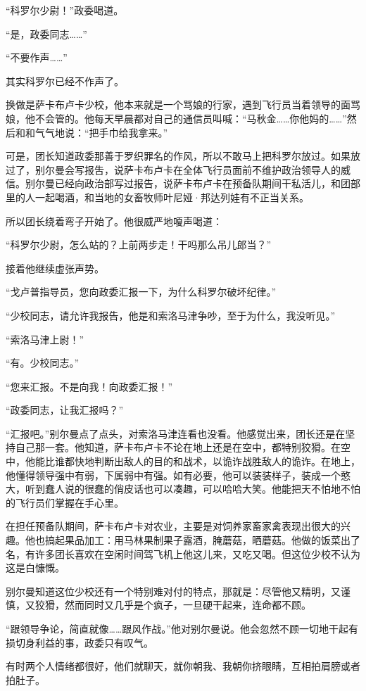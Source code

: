 “科罗尔少尉！”政委喝道。

“是，政委同志……”

“不要作声……”

其实科罗尔已经不作声了。

换做是萨卡布卢卡少校，他本来就是一个骂娘的行家，遇到飞行员当着领导的面骂娘，他不会管的。他每天早晨都对自己的通信员叫喊：“马秋金……你他妈的……”然后和和气气地说：“把手巾给我拿来。”

可是，团长知道政委那善于罗织罪名的作风，所以不敢马上把科罗尔放过。如果放过了，别尔曼会写报吿，说萨卡布卢卡在全体飞行员面前不维护政治领导人的威信。别尔曼已经向政治部写过报告，说萨卡布卢卡在预备队期间干私活儿，和团部里的人一起喝酒，和当地的女畜牧师叶尼娅·邦达列娃有不正当关系。

所以团长绕着弯子开始了。他很威严地嗄声喝道：

“科罗尔少尉，怎么站的？上前两步走！干吗那么吊儿郎当？”

接着他继续虚张声势。

“戈卢普指导员，您向政委汇报一下，为什么科罗尔破坏纪律。”

“少校同志，请允许我报告，他是和索洛马津争吵，至于为什么，我没听见。”

“索洛马津上尉！”

“有。少校同志。”

“您来汇报。不是向我！向政委汇报！”

“政委同志，让我汇报吗？”

“汇报吧。”别尔曼点了点头，对索洛马津连看也没看。他感觉出来，团长还是在坚持自己那一套。他知道，萨卡布卢卡不论在地上还是在空中，都特别狡猾。在空中，他能比谁都快地判断出敌人的目的和战术，以诡诈战胜敌人的诡诈。在地上，他懂得领导强中有弱，下属弱中有强。如有必要，他可以装装样子，装成一个憨大，听到蠢人说的很蠢的俏皮话也可以凑趣，可以哈哈大笑。他能把天不怕地不怕的飞行员们掌握在手心里。

在担任预备队期间，萨卡布卢卡对农业，主要是对饲养家畜家禽表现出很大的兴趣。他也搞起果品加工：用马林果制果子露酒，腌蘑菇，晒蘑菇。他做的饭菜出了名，有许多团长喜欢在空闲时间驾飞机上他这儿来，又吃又喝。但这位少校不认为这是白慷慨。

别尔曼知道这位少校还有一个特别难对付的特点，那就是：尽管他又精明，又谨慎，又狡猾，然而同时又几乎是个疯子，一旦硬干起来，连命都不顾。

“跟领导争论，简直就像……跟风作战。”他对别尔曼说。他会忽然不顾一切地干起有损切身利益的事，政委只有叹气。

有时两个人情绪都很好，他们就聊天，就你朝我、我朝你挤眼睛，互相拍肩膀或者拍肚子。

